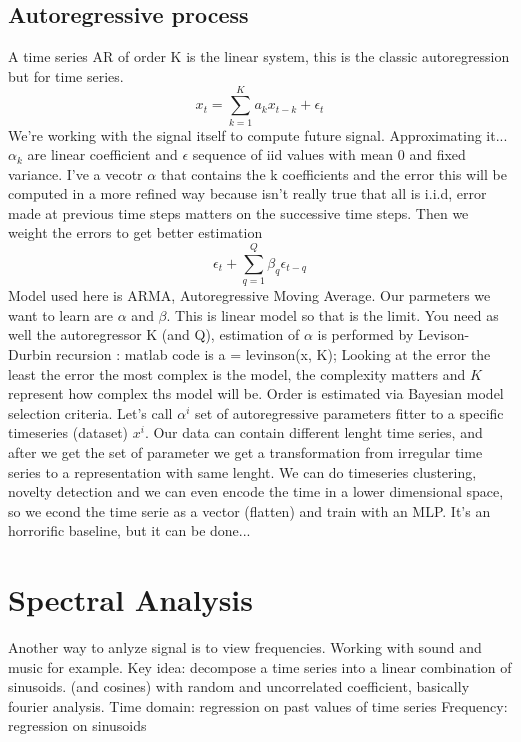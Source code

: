 \documentclass[12pt]{book}
\begin{document}
\subsection{Autoregressive process}
A time series AR of order K is the linear system, this is the classic autoregression but for time series.
\begin{equation}
	x_t=\sum_{k=1}^K a_k x_{t-k}+\epsilon_t
\end{equation}
We're working with the signal itself to compute future signal. Approximating it...\newline
$\alpha_k$ are linear coefficient and $\epsilon$ sequence of iid values with mean 0 and fixed variance.\newline
I've a vecotr $\alpha$ that contains the k coefficients and the error this will be computed in a more refined way because isn't really true that all is i.i.d, error made at previous time steps matters on the successive time steps. Then we weight the errors to get better estimation\newline 
\begin{equation}
\epsilon_t + \sum_{q=1}^Q \beta_q \epsilon_{t-q}
\end{equation}
Model used here is ARMA, Autoregressive Moving Average. \newline
Our parmeters we want to learn are $\alpha$ and $\beta$. This is linear model so that is the limit. \newline
You need as well the autoregressor K (and Q), estimation of $\alpha$ is performed by Levison-Durbin recursion : matlab code is 
a = levinson(x, K); \newline
Looking at the error the least the error the most complex is the model, the complexity matters and $K$ represent how complex ths model will be.
Order is estimated via Bayesian model selection criteria. \newline
Let's call $\alpha^i$ set of autoregressive parameters fitter to a specific timeseries (dataset) $x^i$. Our data can contain different lenght time series, and after we get the set of parameter we get a transformation from irregular time series to a representation with same lenght.
We can do timeseries clustering, novelty detection and we can even encode the time in a lower dimensional space, so we econd the time serie as a vector (flatten) and train with an MLP. It's an horrorific baseline, but it can be done...

\section{Spectral Analysis}
Another way to anlyze signal is to view frequencies. \newline 
Working with sound and music for example. \newline
Key idea: decompose a time series into a linear combination of sinusoids. (and cosines) with random and uncorrelated coefficient, basically fourier analysis.\newline
Time domain: regression on past values of time series
Frequency: regression on sinusoids
\end{document}
